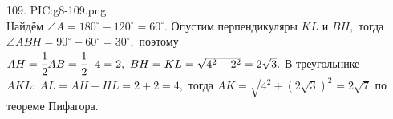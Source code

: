 109. {{PIC:g8-109.png}}\\
Найдём $\angle A=180^\circ-120^\circ=60^\circ.$ Опустим перпендикуляры $KL$ и $BH,$ тогда $\angle ABH=90^\circ-60^\circ=30^\circ,$ поэтому $AH=\cfrac{1}{2}AB=\cfrac{1}{2}\cdot4=2,\ BH=KL=\sqrt{4^2-2^2}=2\sqrt{3}.$ В треугольнике $AKL:\ AL=AH+HL=2+2=4,$ тогда $AK=\sqrt{4^2+(2\sqrt{3})^2}=2\sqrt{7}$ по теореме Пифагора.\\
